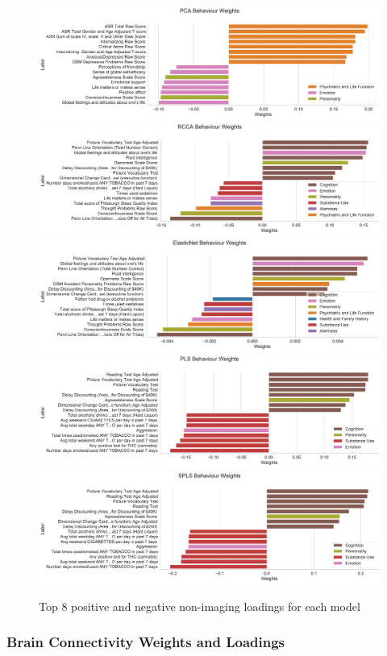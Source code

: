 \begin{figure}
\centering
\includegraphics[width=0.8\linewidth]{figures/hcp/PCA behaviour weights}
\includegraphics[width=0.8\linewidth]{figures/hcp/RCCA behaviour weights}
\includegraphics[width=0.8\linewidth]{figures/hcp/ElasticNet behaviour weights}
\includegraphics[width=0.8\linewidth]{figures/hcp/PLS behaviour weights}
\includegraphics[width=0.8\linewidth]{figures/hcp/SPLS behaviour weights}
\caption{Top 8 positive and negative non-imaging loadings for each model}\label{fig:behaviour}
\end{figure}

\subsubsection{Brain Connectivity Weights and Loadings}

